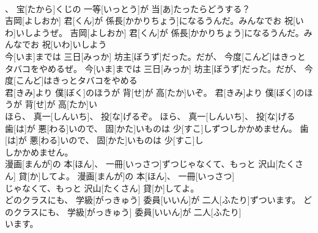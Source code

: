 \documentclass[8pt]{extreport}
\begin{document}
\begin{CJK}{UTF8}{min}
\\	、 宝[たから]くじの 一等[いっとう]が 当[あ]たったらどうする？	
\\	吉岡[よしおか] 君[くん]が 係長[かかりちょう]になるうんだ。みんなでお 祝[いわ]いしようぜ。	吉岡[よしおか] 君[くん]が 係長[かかりちょう]になるうんだ。みんなでお 祝[いわ]いしよう
\\	今[いま]までは 三日[みっか] 坊主[ぼうず]だった。だが、 今度[こんど]はきっとタバコをやめるぜ。	今[いま]までは 三日[みっか] 坊主[ぼうず]だった。だが、 今度[こんど]はきっとタバコをやめる
\\	君[きみ]より 僕[ぼく]のほうが 背[せ]が 高[たか]いぞ。	君[きみ]より 僕[ぼく]のほうが 背[せ]が 高[たか]い
\\	ほら、 真一[しんいち]、 投[な]げるぞ。	ほら、 真一[しんいち]、 投[な]げる
\\	歯[は]が 悪[わる]いので、 固[かた]いものは 少[すこ]しずつしかかめません。	歯[は]が 悪[わる]いので、 固[かた]いものは 少[すこ]し
\\	しかかめません。	
\\	漫画[まんが]の 本[ほん]、 一冊[いっさつ]ずつじゃなくて、もっと 沢山[たくさん] 貸[か]してよ。	漫画[まんが]の 本[ほん]、 一冊[いっさつ]
\\	じゃなくて、もっと 沢山[たくさん] 貸[か]してよ。	
\\	どのクラスにも、 学級[がっきゅう] 委員[いいん]が 二人[ふたり]ずついます。	どのクラスにも、 学級[がっきゅう] 委員[いいん]が 二人[ふたり]
\\	います。	
\end{CJK}
\end{document}
